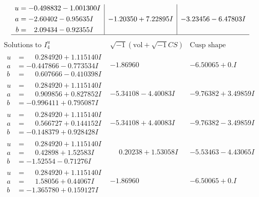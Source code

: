 \documentclass[1p]{elsarticle_modified}
\theoremstyle{definition}
\newcommand{\I}{\sqrt{-1}}
\begin{document}
$$\begin{array}{c|c|c}
\begin{aligned}
u &= -0.498832 - 1.001300 I \\
a &= -2.60402 - 0.95635 I \\
b &= \phantom{-}2.09434 - 0.92355 I\end{aligned}
 & -1.20350 + 7.22895 I & -3.23456 - 6.47803 I\\
 \hline 
 \end{array}$$\newpage$$\begin{array}{c|c|c}  
\text{Solutions to }I^u_{4}& \I (\text{vol} + \sqrt{-1}CS) & \text{Cusp shape}\\
 \hline 
\begin{aligned}
u &= \phantom{-}0.284920 + 1.115140 I \\
a &= -0.447866 - 0.773534 I \\
b &= \phantom{-}0.607666 - 0.410398 I\end{aligned}
 & -1.86960\phantom{ +0.000000I} & -6.50065 + 0. I\phantom{ +0.000000I} \\ \hline\begin{aligned}
u &= \phantom{-}0.284920 + 1.115140 I \\
a &= \phantom{-}0.909856 + 0.827852 I \\
b &= -0.996411 + 0.795087 I\end{aligned}
 & -5.34108 - 4.40083 I & -9.76382 + 3.49859 I \\ \hline\begin{aligned}
u &= \phantom{-}0.284920 + 1.115140 I \\
a &= \phantom{-}0.566727 + 0.144152 I \\
b &= -0.148379 + 0.928428 I\end{aligned}
 & -5.34108 + 4.40083 I & -9.76382 - 3.49859 I \\ \hline\begin{aligned}
u &= \phantom{-}0.284920 + 1.115140 I \\
a &= \phantom{-}0.42898 + 1.52583 I \\
b &= -1.52554 - 0.71276 I\end{aligned}
 & \phantom{-}0.20238 + 1.53058 I & -5.53463 - 4.43065 I \\ \hline\begin{aligned}
u &= \phantom{-}0.284920 + 1.115140 I \\
a &= \phantom{-}1.58056 + 0.44067 I \\
b &= -1.365780 + 0.159127 I\end{aligned}
 & -1.86960\phantom{ +0.000000I} & -6.50065 + 0. I\phantom{ +0.000000I} \\ \hline\begin{aligned}

\end{aligned}
\end{array}$$
\end{document}
